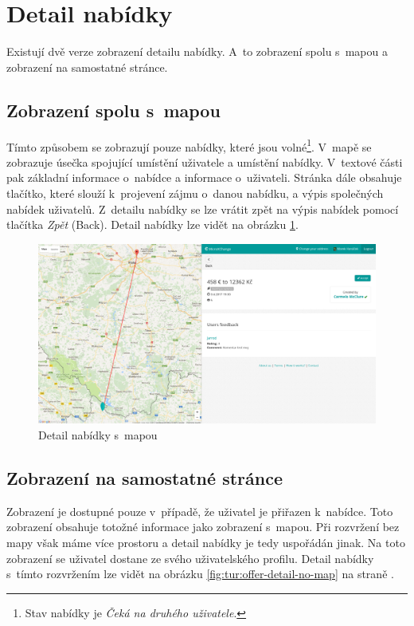 \section{Detail nabídky}

\label{nur:detail}

Existují dvě verze zobrazení detailu nabídky. A~to zobrazení spolu s~mapou a zobrazení na samostatné stránce.

\subsection{Zobrazení spolu s~mapou}
Tímto způsobem se zobrazují pouze nabídky, které jsou volné\footnote{Stav nabídky je \textit{Čeká na druhého uživatele}.}. V~mapě se zobrazuje úsečka spojující umístění uživatele a umístění nabídky. V~textové části pak základní informace o~nabídce a informace o~uživateli. Stránka dále obsahuje tlačítko, které slouží k~projevení zájmu o~danou nabídku, a výpis společných nabídek uživatelů. Z~detailu nabídky se lze vrátit zpět na výpis nabídek pomocí tlačítka \textit{Zpět} (Back). Detail nabídky lze vidět na obrázku \ref{fig:tur:offer-detail-map}.

\begin{figure}[!h]
    \centering
    \includegraphics[width=1.0\textwidth]{media/tur/offer-detail-map.png}
    \caption{Detail nabídky s~mapou}
    \label{fig:tur:offer-detail-map}
\end{figure}

\subsection{Zobrazení na samostatné stránce}
Zobrazení je dostupné pouze v~případě, že uživatel je přiřazen k~nabídce. Toto zobrazení obsahuje totožné informace jako zobrazení s~mapou. Při rozvržení bez mapy však máme více prostoru a detail nabídky je tedy uspořádán jinak. Na toto zobrazení se uživatel dostane ze svého uživatelského profilu. Detail nabídky s~tímto rozvržením lze vidět na obrázku \ref{fig:tur:offer-detail-no-map} na straně \pageref{fig:tur:offer-detail-no-map}.


